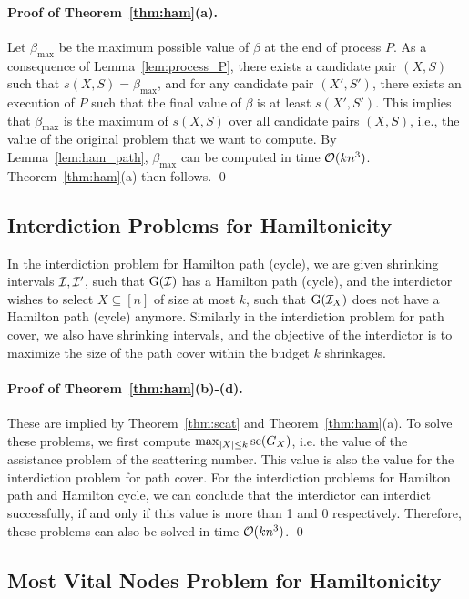 \paragraph*{Proof of Theorem~\ref{thm:ham}(a).}
Let $\beta_{\max}$ be the maximum possible value of $\beta$ at the end of process $P$.
As a consequence of Lemma~\ref{lem:process_P}, there exists a candidate pair $(X,S)$ such that $s(X,S) = \beta_{\max}$, and
for any candidate pair $(X',S')$, there exists an execution of $P$ such that the final value of $\beta$ is at least $s(X',S')$.
This implies that $\beta_{\max}$ is the maximum of $s(X,S)$ over all candidate pairs $(X,S)$, i.e., the value of the original problem that we want to compute.
By Lemma~\ref{lem:ham_path}, $\beta_{\max}$ can be computed in time $\mathcal{O}(kn^3)$.
Theorem~\ref{thm:ham}(a) then follows.
\qed

\subsection{Interdiction Problems for Hamiltonicity}
\label{subsection:ham_interdict}

In the interdiction problem for Hamilton path (cycle), we are given shrinking intervals $\mathcal{I}, \mathcal{I}'$, such that $\operatorname{G}(\mathcal{I})$ has a Hamilton path (cycle), and the interdictor wishes to select $X \subseteq [n]$ of size at most $k$, such that $\operatorname{G}(\mathcal{I}_X)$ does not have a Hamilton path (cycle) anymore.
Similarly in the interdiction problem for path cover, we also have shrinking intervals, and the objective of the interdictor is to maximize the size of the path cover within the budget $k$ shrinkages.

\paragraph*{Proof of Theorem~\ref{thm:ham}(b)-(d).}
These are implied by Theorem~\ref{thm:scat} and Theorem~\ref{thm:ham}(a).
To solve these problems, we first compute $\max_{|X| \leq k}\text{sc}(G_X)$, i.e. the value of the assistance problem of the scattering number.
This value is also the value for the interdiction problem for path cover.
For the interdiction problems for Hamilton path and Hamilton cycle, we can conclude that the interdictor can interdict successfully, if and only if this value is more than 1 and 0 respectively.
Therefore, these problems can also be solved in time $\mathcal{O}(kn^3)$.
\qed

\subsection{Most Vital Nodes Problem for Hamiltonicity}
\label{subsection:ham_mvn}

